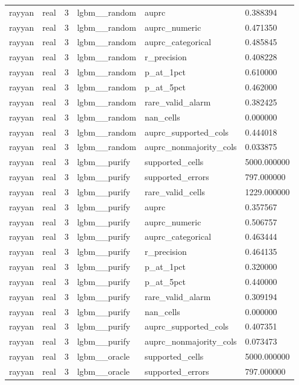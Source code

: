 \begin{tabular}{llllll}
rayyan & real & 3 & lgbm\_\_random & auprc & 0.388394 \\
rayyan & real & 3 & lgbm\_\_random & auprc\_numeric & 0.471350 \\
rayyan & real & 3 & lgbm\_\_random & auprc\_categorical & 0.485845 \\
rayyan & real & 3 & lgbm\_\_random & r\_precision & 0.408228 \\
rayyan & real & 3 & lgbm\_\_random & p\_at\_1pct & 0.610000 \\
rayyan & real & 3 & lgbm\_\_random & p\_at\_5pct & 0.462000 \\
rayyan & real & 3 & lgbm\_\_random & rare\_valid\_alarm & 0.382425 \\
rayyan & real & 3 & lgbm\_\_random & nan\_cells & 0.000000 \\
rayyan & real & 3 & lgbm\_\_random & auprc\_supported\_cols & 0.444018 \\
rayyan & real & 3 & lgbm\_\_random & auprc\_nonmajority\_cols & 0.033875 \\
rayyan & real & 3 & lgbm\_\_purify & supported\_cells & 5000.000000 \\
rayyan & real & 3 & lgbm\_\_purify & supported\_errors & 797.000000 \\
rayyan & real & 3 & lgbm\_\_purify & rare\_valid\_cells & 1229.000000 \\
rayyan & real & 3 & lgbm\_\_purify & auprc & 0.357567 \\
rayyan & real & 3 & lgbm\_\_purify & auprc\_numeric & 0.506757 \\
rayyan & real & 3 & lgbm\_\_purify & auprc\_categorical & 0.463444 \\
rayyan & real & 3 & lgbm\_\_purify & r\_precision & 0.464135 \\
rayyan & real & 3 & lgbm\_\_purify & p\_at\_1pct & 0.320000 \\
rayyan & real & 3 & lgbm\_\_purify & p\_at\_5pct & 0.440000 \\
rayyan & real & 3 & lgbm\_\_purify & rare\_valid\_alarm & 0.309194 \\
rayyan & real & 3 & lgbm\_\_purify & nan\_cells & 0.000000 \\
rayyan & real & 3 & lgbm\_\_purify & auprc\_supported\_cols & 0.407351 \\
rayyan & real & 3 & lgbm\_\_purify & auprc\_nonmajority\_cols & 0.073473 \\
rayyan & real & 3 & lgbm\_\_oracle & supported\_cells & 5000.000000 \\
rayyan & real & 3 & lgbm\_\_oracle & supported\_errors & 797.000000 \\

\end{tabular}
